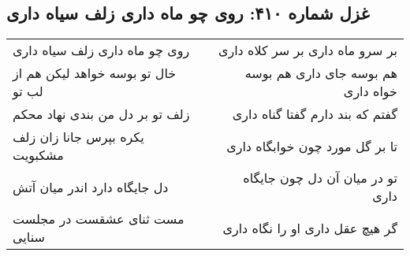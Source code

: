 \begin{center}
\section*{غزل شماره ۴۱۰: روی چو ماه داری زلف سیاه داری}
\label{sec:410}
\begin{longtable}{l p{0.5cm} r}
روی چو ماه داری زلف سیاه داری
&&
بر سرو ماه داری بر سر کلاه داری
\\
خال تو بوسه خواهد لیکن هم از لب تو
&&
هم بوسه جای داری هم بوسه خواه داری
\\
زلف تو بر دل من بندی نهاد محکم
&&
گفتم که بند دارم گفتا گناه داری
\\
یکره بپرس جانا زان زلف مشکبویت
&&
تا بر گل مورد چون خوابگاه داری
\\
دل جایگاه دارد اندر میان آتش
&&
تو در میان آن دل چون جایگاه داری
\\
مست ثنای عشقست در مجلست سنایی
&&
گر هیچ عقل داری او را نگاه داری
\\
\end{longtable}
\end{center}
